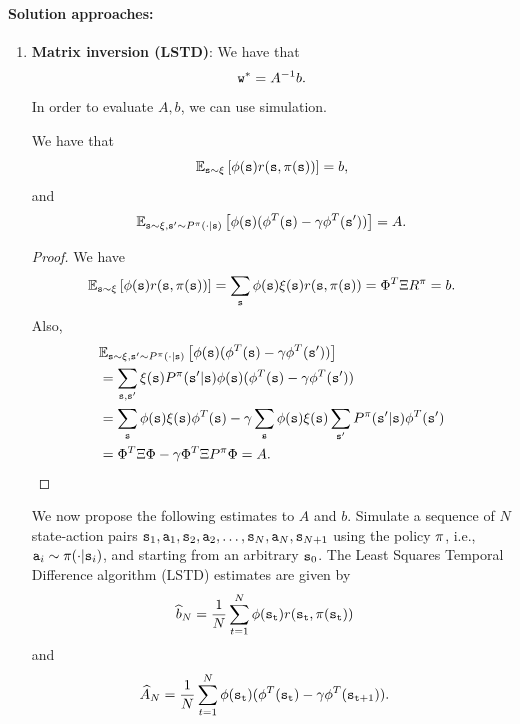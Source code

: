 \paragraph{Solution approaches:}
\begin{enumerate}
\item \textbf{Matrix inversion (LSTD)}: 
We have that $${\tt w}^* = A^{-1}b.$$
In order to evaluate $A,b$, we can use simulation.
\begin{proposition}\label{prop:TD_expectations}
    We have that 
    \begin{equation*}
        \mathbb{E}_{{\tt s}\sim\xi}\left[ {\phi}({\tt s}) r({\tt s},\pi({\tt s})) \right] = b,
    \end{equation*}
    and
    \begin{equation*}
        \mathbb{E}_{{\tt s}\sim\xi, {\tt s}'\sim P^\pi(\cdot|{\tt s})}\left[ {\phi}({\tt s})( {\phi}^T({\tt s})-\gamma {\phi}^T({\tt s}')) \right] = A.
    \end{equation*}
\end{proposition}
\begin{proof}
    We have
    \begin{equation*}
        \mathbb{E}_{{\tt s}\sim\xi}\left[ {\phi}({\tt s}) r({\tt s},\pi({\tt s})) \right] = \sum_{{\tt s}}  {\phi}({\tt s}) \xi({\tt s}) r({\tt s},\pi({\tt s})) = \Phi^T\Xi R^\pi = b.
    \end{equation*}
    Also,
    \begin{equation*}
    \begin{split}
        &\mathbb{E}_{{\tt s}\sim\xi, {\tt s}'\sim P^\pi(\cdot|{\tt s})}\left[ {\phi}({\tt s})( {\phi}^T({\tt s})-\gamma {\phi}^T({\tt s}')) \right] \\
        &= \sum_{{\tt s},{\tt s}'} \xi({\tt s})P^\pi({\tt s}'|{\tt s}){\phi}({\tt s})( {\phi}^T({\tt s})-\gamma {\phi}^T({\tt s}')) \\
        &= \sum_{{\tt s}} {\phi}({\tt s}) \xi({\tt s}){\phi}^T({\tt s}) - \gamma\sum_{{\tt s}}{\phi}({\tt s})\xi({\tt s})\sum_{{\tt s}'}P^\pi({\tt s}'|{\tt s}){\phi}^T({\tt s}')\\
        &= \Phi^T \Xi \Phi -\gamma \Phi^T\Xi P^\pi \Phi = A.
    \end{split}
    \end{equation*}
\end{proof}
We now propose the following estimates to $A$ and $b$. Simulate a sequence of $N$ state-action pairs ${\tt s}_1,{\tt a}_1,{\tt s}_2,{\tt a}_2,\dots,{\tt s}_N,{\tt a}_N,{\tt s}_{N+1}$ using the policy $\pi$, i.e., ${\tt a}_i \sim \pi(\cdot|{\tt s}_i)$, and starting from an arbitrary ${\tt s}_0$. The Least Squares Temporal Difference algorithm (LSTD) estimates are given by
\begin{align*}
\widehat{b}_N &= \frac{1}{N} \sum_{t=1}^N  {\phi}({\tt s}_{\tt t}) r({\tt s}_{\tt t},\pi({\tt s}_{\tt t})) \end{align*}
and 
\begin{align*}
\widehat{A}_N &=
\frac{1}{N} \sum_{t=1}^N {\phi}({\tt s}_{\tt t})( {\phi}^T({\tt s}_{\tt t})-\gamma {\phi}^T({\tt s}_{{\tt t}+1})).
\end{align*}


\end{enumerate}
